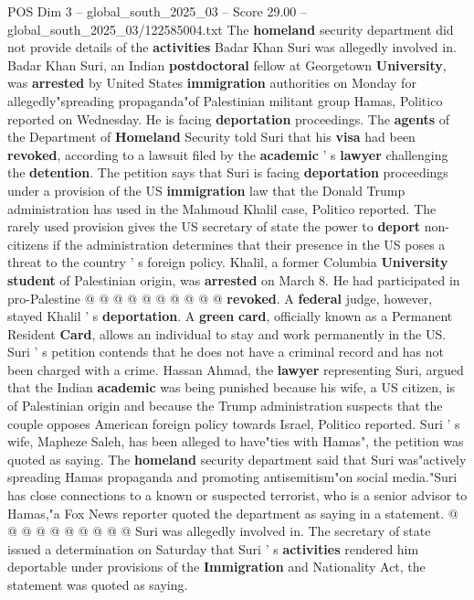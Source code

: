 \begin{textsample}{POS Dim 3 – global\_south\_2025\_03 – Score 29.00 – global\_south\_2025\_03/122585004.txt}  \label{ex:f3_pos_038}
The \textbf{homeland} security department did not provide details of the \textbf{activities} Badar Khan Suri was allegedly involved in.
Badar Khan Suri, an Indian \textbf{postdoctoral} fellow at Georgetown \textbf{University}, was \textbf{arrested} by United States \textbf{immigration} authorities on Monday for allegedly"spreading propaganda"of Palestinian militant group Hamas, Politico reported on Wednesday.
He is facing \textbf{deportation} proceedings.
The \textbf{agents} of the Department of \textbf{Homeland} Security told Suri that his \textbf{visa} had been \textbf{revoked}, according to a lawsuit filed by the \textbf{academic} ' s \textbf{lawyer} challenging the \textbf{detention}.
The petition says that Suri is facing \textbf{deportation} proceedings under a provision of the US \textbf{immigration} law that the Donald Trump administration has used in the Mahmoud Khalil case, Politico reported.
The rarely used provision gives the US secretary of state the power to \textbf{deport} non-citizens if the administration determines that their presence in the US poses a threat to the country ' s foreign policy.
Khalil, a former Columbia \textbf{University} \textbf{student} of Palestinian origin, was \textbf{arrested} on March 8.
He had participated in pro-Palestine @ @ @ @ @ @ @ @ @ @ \textbf{revoked}.
A \textbf{federal} judge, however, stayed Khalil ' s \textbf{deportation}.
A \textbf{green} \textbf{card}, officially known as a Permanent Resident \textbf{Card}, allows an individual to stay and work permanently in the US.
Suri ' s petition contends that he does not have a criminal record and has not been charged with a crime.
Hassan Ahmad, the \textbf{lawyer} representing Suri, argued that the Indian \textbf{academic} was being punished because his wife, a US citizen, is of Palestinian origin and because the Trump administration suspects that the couple opposes American foreign policy towards Israel, Politico reported.
Suri ' s wife, Mapheze Saleh, has been alleged to have"ties with Hamas", the petition was quoted as saying.
The \textbf{homeland} security department said that Suri was"actively spreading Hamas propaganda and promoting antisemitism"on social media."Suri has close connections to a known or suspected terrorist, who is a senior advisor to Hamas,"a Fox News reporter quoted the department as saying in a statement. @ @ @ @ @ @ @ @ @ @ Suri was allegedly involved in.
The secretary of state issued a determination on Saturday that Suri ' s \textbf{activities} rendered him deportable under provisions of the \textbf{Immigration} and Nationality Act, the statement was quoted as saying.

\end{textsample}
